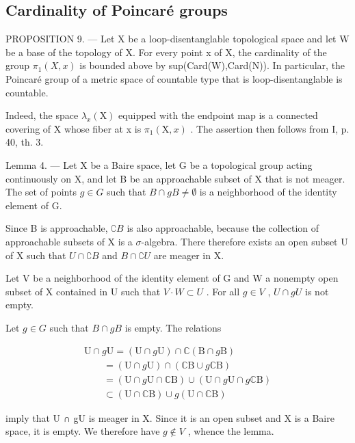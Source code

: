 \subsection{Cardinality of Poincaré groups}

PROPOSITION 9. --- Let X be a loop-disentanglable topological space and let W be a base of the topology of X. For every point x of X, the cardinality of the group \(\pi_{1}(X,x)\) is bounded above by sup(Card(W),Card(N)). In particular, the Poincaré group of a metric space of countable type that is loop-disentanglable is countable.

Indeed, the space \(\lambda_{x}(\mathrm{X})\) equipped with the endpoint map is a connected covering of X whose fiber at x is \(\pi_{1}(\mathrm{X}, x)\) . The assertion then follows from I, p. 40, th. 3.

Lemma 4. --- Let X be a Baire space, let G be a topological group acting continuously on X, and let B be an approachable subset of X that is not meager. The set of points \(g \in G\) such that \(B \cap gB \neq \emptyset\) is a neighborhood of the identity element of G.

Since B is approachable, \(\complement B\) is also approachable, because the collection of approachable subsets of X is a \(\sigma\)-algebra. There therefore exists an open subset U of X such that \(U \cap \complement B\) and \(B \cap \complement U\) are meager in X.

Let V be a neighborhood of the identity element of G and W a nonempty open subset of X contained in U such that \(V \cdot W \subset U\) . For all \(g \in V\) , \(U \cap gU\) is not empty.

Let \(g \in G\) such that \(B \cap gB\) is empty. The relations

\[
\begin{array}{l} \mathrm{U} \cap g \mathrm{U} = (\mathrm{U} \cap g \mathrm{U}) \cap \mathbb {C} (\mathrm{B} \cap g \mathrm{B}) \\ \qquad = (\mathrm{U} \cap g \mathrm{U}) \cap (\mathbb {C} \mathrm{B} \cup g \mathbb {C} \mathrm{B}) \\ \qquad = (\mathrm{U} \cap g \mathrm{U} \cap \mathbb {C} \mathrm{B}) \cup (\mathrm{U} \cap g \mathrm{U} \cap g \mathbb {C} \mathrm{B}) \\ \qquad \subset (\mathrm{U} \cap \mathbb {C} \mathrm{B}) \cup g (\mathrm{U} \cap \mathbb {C} \mathrm{B}) \end{array}
\]

imply that U ∩ gU is meager in X. Since it is an open subset and X is a Baire space, it is empty. We therefore have \(g \notin V\) , whence the lemma.

